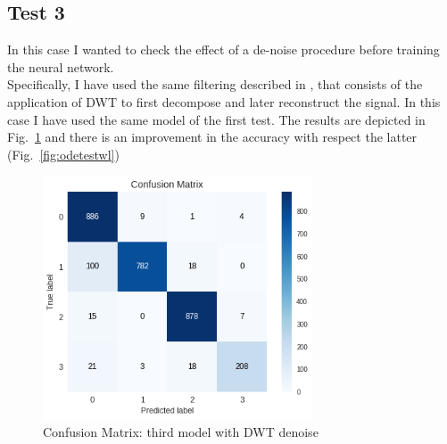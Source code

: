 \documentclass[LaM,binding=0.6cm]{sapthesis}
\begin{document}
\subsection{Test 3}
In this case I wanted to check the effect of a de-noise procedure before training the neural network.\\Specifically, I have used the same filtering described in \cite{svmnl}, that consists of the application of DWT to first decompose and later reconstruct the signal. In this case I have used the same model of the first test. The results are depicted in Fig.~\ref{fig:odedwt} and there is an improvement in the accuracy with respect the latter (Fig.~\ref{fig:odetestwl}) 
\begin{figure}[H]  \centering
	\includegraphics[width=80mm,scale=0.7]{odedwt.png}
	\caption{Confusion Matrix: third model with DWT denoise}
	\label{fig:odedwt}
\end{figure}
\end{document}
